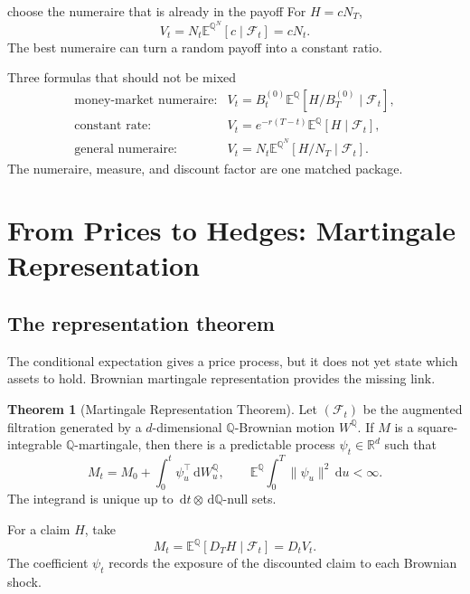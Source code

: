 \documentclass[10pt]{article}
\newcommand{\E}{\mathbb E}
\newcommand{\Q}{\mathbb Q}
\newcommand{\R}{\mathbb R}
\newcommand{\1}{\mathbf 1}
\newcommand{\cF}{\mathcal F}
\newcommand{\dd}{\,\mathrm d}
\theoremstyle{definition}
\newtheorem{theorem}[definition]{Theorem}
\begin{document}
\begin{boardexample}{choose the numeraire that is already in the payoff}
For \(H=cN_T\),
\[
V_t=N_t\E^{\Q^N}[c\mid\cF_t]=cN_t.
\]
The best numeraire can turn a random payoff into a constant ratio.
\end{boardexample}

\begin{warningbox}{Three formulas that should not be mixed}
\[
\begin{array}{ll}
\text{money-market numeraire:}
&V_t=B_t^{(0)}\E^\Q[H/B_T^{(0)}\mid\cF_t],\\[0.25em]
\text{constant rate:}
&V_t=e^{-r(T-t)}\E^\Q[H\mid\cF_t],\\[0.25em]
\text{general numeraire:}
&V_t=N_t\E^{\Q^N}[H/N_T\mid\cF_t].
\end{array}
\]
The numeraire, measure, and discount factor are one matched package.
\end{warningbox}

\section{From Prices to Hedges: Martingale Representation}

\subsection{The representation theorem}

The conditional expectation gives a price process, but it does not yet state
which assets to hold. Brownian martingale representation provides the missing
link.

\begin{theorem}[Martingale Representation Theorem]
Let \((\cF_t)\) be the augmented filtration generated by a
\(d\)-dimensional \(\Q\)-Brownian motion \(W^\Q\). If
\(M\) is a square-integrable \(\Q\)-martingale, then there is a predictable
process \(\psi_t\in\R^d\) such that
\[
\boxed{
M_t=M_0+\int_0^t\psi_u^\top\dd W_u^\Q,
\qquad
\E^\Q\int_0^T\|\psi_u\|^2\dd u<\infty.}
\]
The integrand is unique up to
\(\dd t\otimes\dd\Q\)-null sets.
\end{theorem}

For a claim \(H\), take
\[
M_t=\E^\Q[D_TH\mid\cF_t]=D_tV_t.
\]
The coefficient \(\psi_t\) records the exposure of the discounted claim to
each Brownian shock.
\end{document}
